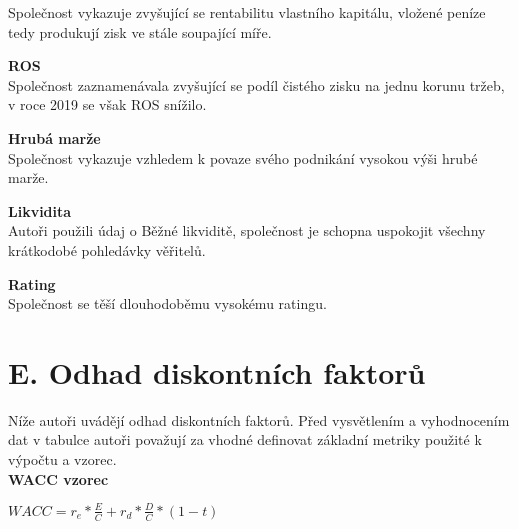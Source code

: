 Společnost vykazuje zvyšující se rentabilitu vlastního kapitálu, vložené peníze tedy produkují zisk ve stále soupající míře.\\

\vspace*{-2mm}

\noindent\textbf{ROS}\\

Společnost zaznamenávala zvyšující se podíl čistého zisku na jednu korunu tržeb, v roce 2019 se však ROS snížilo.\\

\vspace*{-2mm}

\noindent\textbf{Hrubá marže}\\

Společnost vykazuje vzhledem k povaze svého podnikání vysokou výši hrubé marže.\\

\vspace*{-2mm}

\noindent\textbf{Likvidita}\\

Autoři použili údaj o Běžné likviditě, společnost je schopna uspokojit všechny krátkodobé pohledávky věřitelů.\\

\vspace*{-2mm}

\noindent\textbf{Rating}\\

Společnost se těší dlouhodoběmu vysokému ratingu.\\

\newpage

\section*{E. Odhad diskontních faktorů}
\label{sec:Odhad diskontnich faktoru}

Níže autoři uvádějí odhad diskontních faktorů. Před vysvětlením a vyhodnocením dat v tabulce autoři považují za vhodné definovat základní metriky použité k výpočtu a vzorec.\\

\noindent\textbf{WACC vzorec}\\

\begin{center}
$WACC = r_e * \frac{E}{C} + r_d * \frac{D}{C} * (1 - t)$\\
\end{center}

